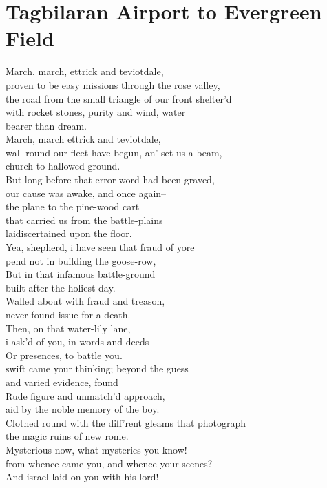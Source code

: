 \documentclass[smalldemyvopaper,11pt,twoside,onecolumn,openright,extrafontsizes]{memoir}
\begin{document}
\chapter{Tagbilaran Airport to Evergreen Field}
March, march, ettrick and teviotdale,
\\proven to be easy missions through the rose valley,
\\the road from the small triangle of our front shelter'd
\\with rocket stones, purity and wind, water
\\bearer than dream.
\\March, march ettrick and teviotdale,
\\wall round our fleet have begun, an' set us a-beam,
\\church to hallowed ground.
\\But long before that error-word had been graved,
\\our cause was awake, and once again--
\\the plane to the pine-wood cart
\\that carried us from the battle-plains
\\laidiscertained upon the floor.
\\Yea, shepherd, i have seen that fraud of yore
\\pend not in building the goose-row,
\\But in that infamous battle-ground
\\built after the holiest day.
\\Walled about with fraud and treason,
\\never found issue for a death.
\\Then, on that water-lily lane,
\\i ask'd of you, in words and deeds
\\Or presences, to battle you.
\\swift came your thinking; beyond the guess
\\and varied evidence, found
\\Rude figure and unmatch'd approach,
\\aid by the noble memory of the boy.
\\Clothed round with the diff'rent gleams that photograph
\\the magic ruins of new rome.
\\Mysterious now, what mysteries you know!
\\from whence came you, and whence your scenes?
\\And israel laid on you with his lord!
\end{document}
